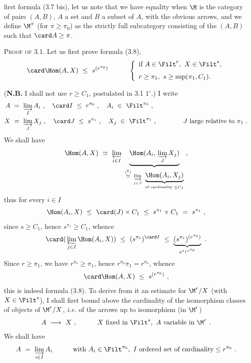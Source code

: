 first formula (3.7 bis), let us note that we have equality when $\M$ is the category of pairs $(A,B)$, $A$ a set and $B$ a subset of $A$, with the obvious arrows, and we define $\M^\pi$ (for $\pi\geq\pi_0$) as the strictly full subcategory consisting of the $(A,B)$ such that $\card A\geq\pi$.

\textsc{Proof of} 3.1. Let us first prove formula (3.8),
\[
\card\Hom(A,X)\ \leq\ s^{(r^{\pi_0})}\qquad\quad
\left\{\begin{array}{l}
\text{if } A\in\Filt^r,\ X\in\Filt^s,\\[1.5ex]
r\geq\pi_1,\ s\geq\sup(\pi_1,C_1).
\end{array}\right.
\]

(\textbf{N.B.} I shall not use $r\geq C_1$, postulated in 3.1 $1^\circ$.) I write 
\[
\begin{aligned}
A\ &=\ \varinjlim_I A_i\ ,\quad \card I\ \leq\ r^{\pi_0}\ ,\quad A_i\ \in\ \Filt^{\pi_0}\ ,\\
X\ &=\ \varinjlim_J X_j\ ,\quad \card J\ \leq\ s^{\pi_1}\ ,\quad X_j\ \in\ \Filt^{\pi_1}\ ,\qquad\qquad J\text{ large relative to }\pi_1\ .
\end{aligned}
\]
We shall have
\[
\Hom(A,X)\ \simeq\ \varprojlim_{i\in I}\ \underbrace{\Hom(A_i,\,\varinjlim_J X_j)}_{\overset{(\text{\footnotemark[6]})}{\simeq}\ \varinjlim\limits_{j\in J}\ \underbrace{\Hom(A_i,X_j)}_{\text{of cardinality }\leq C_1}}\ ,
\]
thus for every $i\in I$
\[
\Hom(A_i,X)\ \leq\ \card(J)\times C_1\ \leq\ s^{\pi_1}\times C_1\ =\ s^{\pi_1}\ ,
\]
since $s\geq C_1$, hence $s^{\pi_1}\geq C_1$, whence
\[
\card(\,\varprojlim_{j\in I}\Hom(A_i,X))\ \leq\ (s^{\pi_1})^{\card I}\ \leq\ \underbrace{(s^{\pi_1})^{(r^{\pi_0})}}_{s^{\pi_1 r^{\pi_0}}}\ . %
\]
Since $r\geq\pi_1$, we have $r^{\pi_0}\geq\pi_1$, hence $r^{\pi_0}\pi_1=r^{\pi_0}$, whence
\[
\card\Hom(A,X)\ \leq\ s^{(r^{\pi_0})}\ ,
\]
this is indeed formula (3.8). To derive from it an estimate for $\M^r/X$ (with $X\in\Filt^s$),  I shall first bound above the cardinality of the isomorphism classes of objects of $\M^r/X$, \textit{i.e.} of the arrows up to isomorphism (in $\M^r$)
\[
A\ \longrightarrow\ X\ ,\qquad\quad X\text{ fixed in }\Filt^s,\ A\text{ variable in }\M^r\ .
\]
We shall have
\[
A\ =\ \varinjlim_{i\in I} A_i\qquad\quad\text{with } A_i\in\Filt^{\pi_0},\ I\text{ ordered set of cardinality}\leq r^{\pi_0}\ .
\]

